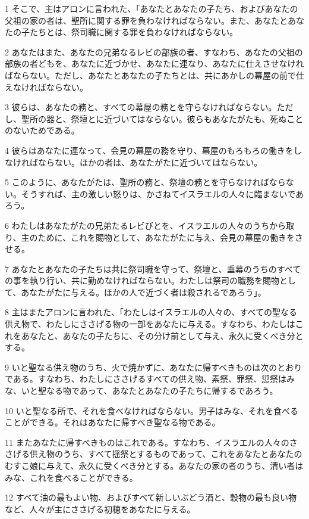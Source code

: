 \par 1 そこで、主はアロンに言われた、「あなたとあなたの子たち、およびあなたの父祖の家の者は、聖所に関する罪を負わなければならない。また、あなたとあなたの子たちとは、祭司職に関する罪を負わなければならない。
\par 2 あなたはまた、あなたの兄弟なるレビの部族の者、すなわち、あなたの父祖の部族の者どもを、あなたに近づかせ、あなたに連なり、あなたに仕えさせなければならない。ただし、あなたとあなたの子たちとは、共にあかしの幕屋の前で仕えなければならない。
\par 3 彼らは、あなたの務と、すべての幕屋の務とを守らなければならない。ただし、聖所の器と、祭壇とに近づいてはならない。彼らもあなたがたも、死ぬことのないためである。
\par 4 彼らはあなたに連なって、会見の幕屋の務を守り、幕屋のもろもろの働きをしなければならない。ほかの者は、あなたがたに近づいてはならない。
\par 5 このように、あなたがたは、聖所の務と、祭壇の務とを守らなければならない。そうすれば、主の激しい怒りは、かさねてイスラエルの人々に臨まないであろう。
\par 6 わたしはあなたがたの兄弟たるレビびとを、イスラエルの人々のうちから取り、主のために、これを賜物として、あなたがたに与え、会見の幕屋の働きをさせる。
\par 7 あなたとあなたの子たちは共に祭司職を守って、祭壇と、垂幕のうちのすべての事を執り行い、共に勤めなければならない。わたしは祭司の職務を賜物として、あなたがたに与える。ほかの人で近づく者は殺されるであろう」。
\par 8 主はまたアロンに言われた、「わたしはイスラエルの人々の、すべての聖なる供え物で、わたしにささげる物の一部をあなたに与える。すなわち、わたしはこれをあなたと、あなたの子たちに、その分け前として与え、永久に受くべき分とする。
\par 9 いと聖なる供え物のうち、火で焼かずに、あなたに帰すべきものは次のとおりである。すなわち、わたしにささげるすべての供え物、素祭、罪祭、愆祭はみな、いと聖なる物であって、あなたとあなたの子たちに帰するであろう。
\par 10 いと聖なる所で、それを食べなければならない。男子はみな、それを食べることができる。それはあなたに帰すべき聖なる物である。
\par 11 またあなたに帰すべきものはこれである。すなわち、イスラエルの人々のささげる供え物のうち、すべて揺祭とするものであって、これをあなたとあなたのむすこ娘に与えて、永久に受くべき分とする。あなたの家の者のうち、清い者はみな、これを食べることができる。
\par 12 すべて油の最もよい物、およびすべて新しいぶどう酒と、穀物の最も良い物など、人々が主にささげる初穂をあなたに与える。
